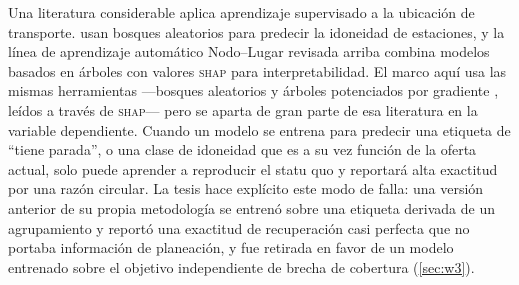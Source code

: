 Una literatura considerable aplica aprendizaje supervisado a la ubicación de transporte.
\textcite{niu2023rf} usan bosques aleatorios para predecir la idoneidad de estaciones, y
la línea de aprendizaje automático Nodo--Lugar revisada arriba \parencite{su2022nodeplace,
aminipishro2022nprt} combina modelos basados en árboles con valores
\textsc{shap} \parencite{lundberg2017shap} para interpretabilidad. El marco aquí usa las
mismas herramientas ---bosques aleatorios \parencite{breiman2001rf} y árboles potenciados
por gradiente \parencite{chen2016xgboost, ke2017lightgbm}, leídos a través de
\textsc{shap}--- pero se aparta de gran parte de esa literatura en la variable
dependiente. Cuando un modelo se entrena para predecir una etiqueta de ``tiene parada'', o
una clase de idoneidad que es a su vez función de la oferta actual, solo puede aprender a
reproducir el statu quo y reportará alta exactitud por una razón circular. La tesis hace
explícito este modo de falla: una versión anterior de su propia metodología se entrenó
sobre una etiqueta derivada de un agrupamiento y reportó una exactitud de recuperación casi
perfecta que no portaba información de planeación, y fue retirada en favor de un modelo
entrenado sobre el objetivo independiente de brecha de cobertura (\cref{sec:w3}).

